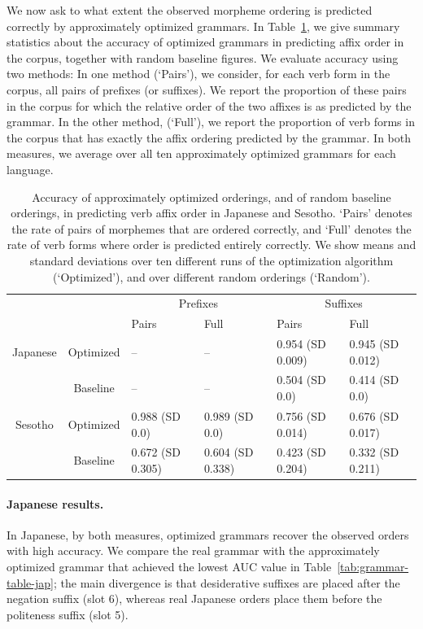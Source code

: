 We now ask to what extent the observed morpheme ordering is predicted correctly by approximately optimized grammars.
In Table~\ref{tab:morph-acc}, we give summary statistics about the accuracy of optimized grammars in predicting affix order in the corpus, together with random baseline figures.
We evaluate accuracy using two methods:
In one method (`Pairs'), we consider, for each verb form in the corpus, all pairs of prefixes (or suffixes).
We report the proportion of these pairs in the corpus for which the relative order of the two affixes is as predicted by the grammar.
In the other method, (`Full'), we report the proportion of verb forms in the corpus that has exactly the affix ordering predicted by the grammar.
In both measures, we average over all ten approximately optimized grammars for each language.

\begin{table}
\begin{tabular}{cc||ll|ll}
             &              & \multicolumn{2}{c}{Prefixes}    & \multicolumn{2}{|c}{Suffixes} \\
             &              & Pairs & Full & Pairs & Full \\ \hline\hline
Japanese & Optimized  & -- &  -- &   0.954 (SD 0.009) & 0.945 (SD 0.012) \\ 
& Baseline    & -- & -- & 0.504 (SD 0.0) & 0.414 (SD 0.0) \\ \hline
Sesotho &   Optimized  &  0.988 (SD 0.0) & 0.989 (SD 0.0) & 0.756 (SD 0.014) & 0.676 (SD 0.017) \\
&   Baseline  &  0.672 (SD 0.305) & 0.604 (SD 0.338) & 0.423 (SD 0.204) & 0.332 (SD 0.211) \\ 
\end{tabular}
\caption{Accuracy of approximately optimized orderings, and of random baseline orderings, in predicting verb affix order in Japanese and Sesotho. `Pairs' denotes the rate of pairs of morphemes that are ordered correctly, and `Full' denotes the rate of verb forms where order is predicted entirely correctly. We show means and standard deviations over ten different runs of the optimization algorithm (`Optimized'), and over different random orderings (`Random').}\label{tab:morph-acc}
\end{table}

\paragraph{Japanese results.} In Japanese, by both measures, optimized grammars recover the observed orders with high accuracy.
We compare the real grammar with the approximately optimized grammar that achieved the lowest AUC value in Table~\ref{tab:grammar-table-jap}; the main divergence is that desiderative suffixes are placed after the negation suffix (slot 6), whereas real Japanese orders place them before the politeness suffix (slot 5).

